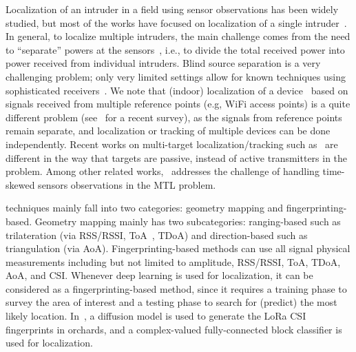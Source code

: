  Localization of an intruder in a field using sensor observations has been widely studied, but most of the works have focused on
localization of a single intruder~\cite{arani2018,dutta2016see}.
In general, to localize multiple intruders, the main challenge comes
from the need to ``separate'' powers at the sensors~\cite{mobicom-30},
i.e., to divide the total received power into power received from
individual intruders. Blind source separation is a very challenging
problem; only very limited settings allow for known
techniques using sophisticated receivers~\cite{freq-sig,ben-zhao}.
We note that (indoor) localization of a
  device~\cite{infocom00-radar} based on signals received from multiple reference points (e.g, WiFi access
  points) is a quite different problem
  (see~\cite{zafari-19} for a recent survey), as the signals from
  reference points remain separate, and localization or tracking of multiple
  devices can be done independently.
  Recent works on multi-target localization/tracking such as~\cite{ipsn19-multipassive} are different in the way that targets are passive, instead of active transmitters in the \mtl problem.
Among other related works,~\cite{multi-tx-dyspan-19} addresses the challenge of handling time-skewed sensors observations in the MTL problem.

 techniques mainly fall into two categories: geometry mapping and fingerprinting-based.
Geometry mapping mainly has two subcategories: ranging-based such as trilateration (via RSS/RSSI, ToA~\cite{zongxing2022tracking}, TDoA) and direction-based such as triangulation (via AoA).
Fingerprinting-based methods can use all signal physical measurements including but not limited to amplitude, RSS/RSSI, ToA, TDoA, AoA, and CSI.
Whenever deep learning is used for localization, it can be considered as a fingerprinting-based method, since it requires a 
training phase to survey the area of interest and a testing phase to search for (predict) the most likely location.
In~\cite{yuning2024localization}, a diffusion model is used to generate the LoRa CSI fingerprints in orchards, 
and a complex-valued fully-connected block classifier is used for localization.

